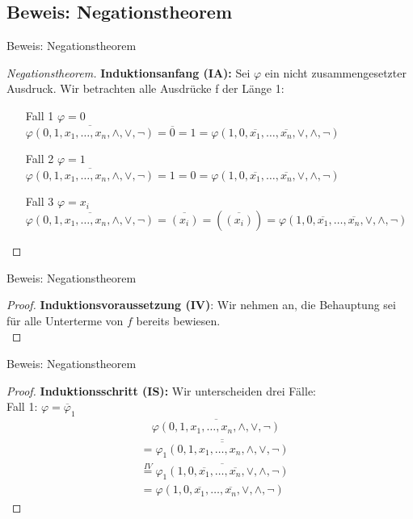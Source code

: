 \documentclass[12pt%
,aspectratio=169%
]{beamer}
\begin{document}
\subsection{Beweis: Negationstheorem}
\begin{frame}{Beweis: Negationstheorem}
\begin{proof}[Negationstheorem]
\textbf{Induktionsanfang (IA):} Sei $\varphi$ ein nicht zusammengesetzter Ausdruck. Wir betrachten alle Ausdrücke f der Länge 1:
\begin{itemize}
	\item[Fall 1] $\varphi = 0$\\
	$\overline{\varphi(0, 1, x_1 , \ldots , x_n , \land, \lor, \neg)} = \overline{0} = 1 = \varphi(1, 0, \overline{x_1} , \ldots ,\overline{x_n} , \lor, \land, \neg)$
	\item[Fall 2] $\varphi = 1$\\
	$\overline{\varphi(0, 1, x_1 , \ldots , x_n , \land, \lor, \neg)} = 1 = 0 = \varphi(1, 0, \overline{x_1} , \ldots ,\overline{x_n} , \lor, \land, \neg)$
	\item[Fall 3] $\varphi = x_i$\\
	$\overline{\varphi(0, 1, x_1 , \ldots , x_n , \land, \lor, \neg)} = \overline{(x_i)} = (\overline{(x_i)}) = \varphi(1, 0, \overline{x_1} , \ldots ,\overline{x_n} , \lor, \land, \neg)$
\end{itemize}
\end{proof}
\end{frame}

\begin{frame}{Beweis: Negationstheorem}
\begin{proof}
\textbf{Induktionsvoraussetzung (IV)}: Wir nehmen an, die Behauptung sei für
alle Unterterme von $f$ bereits bewiesen.\\
\end{proof}
\end{frame}

\begin{frame}{Beweis: Negationstheorem}
\begin{proof}
\textbf{Induktionsschritt (IS):} Wir unterscheiden drei Fälle:\\
Fall 1: $\varphi = \overline{\varphi}_1$
\begin{align*}
&\quad \overline{\varphi(0, 1, x_1 , \ldots , x_n , \land, \lor, \neg)}\\
&= \overline{\overline{\varphi_1(0, 1, x_1 , \ldots , x_n , \land, \lor, \neg)}}\\
&\overset{IV}= \overline{\varphi_1(1, 0, \overline{x_1} , \ldots ,\overline{x_n} , \lor, \land, \neg)}\\
&= \varphi(1, 0, \overline{x_1} , \ldots ,\overline{x_n} , \lor, \land, \neg)
\end{align*}
\end{proof}
\end{frame}
\end{document}
